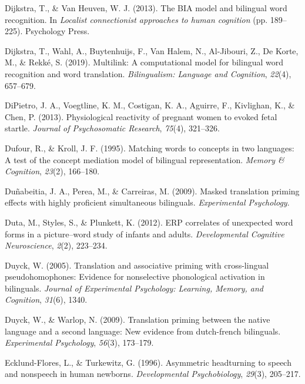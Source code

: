 \documentclass[
  12pt,
  b5paperpaper,
  twoside]{scrreprt}
\newlength{\cslhangindent}
\newlength{\cslentryspacingunit} %
\newenvironment{CSLReferences}[2] %
 {%
  \setlength{\parindent}{0pt}
  \ifodd #1
  \let\oldpar\par
  \def\par{\hangindent=\cslhangindent\oldpar}
  \fi
  \setlength{\parskip}{#2\cslentryspacingunit}
 }%
 {}
\begin{document}
\begin{CSLReferences}{1}{0}
\leavevmode{}%
Dijkstra, T., \& Van Heuven, W. J. (2013). The BIA model and bilingual
word recognition. In \emph{Localist connectionist approaches to human
cognition} (pp. 189--225). Psychology Press.

\leavevmode{}%
Dijkstra, T., Wahl, A., Buytenhuijs, F., Van Halem, N., Al-Jibouri, Z.,
De Korte, M., \& Rekké, S. (2019). Multilink: A computational model for
bilingual word recognition and word translation. \emph{Bilingualism:
Language and Cognition}, \emph{22}(4), 657--679.

\leavevmode{}%
DiPietro, J. A., Voegtline, K. M., Costigan, K. A., Aguirre, F.,
Kivlighan, K., \& Chen, P. (2013). Physiological reactivity of pregnant
women to evoked fetal startle. \emph{Journal of Psychosomatic Research},
\emph{75}(4), 321--326.

\leavevmode{}%
Dufour, R., \& Kroll, J. F. (1995). Matching words to concepts in two
languages: A test of the concept mediation model of bilingual
representation. \emph{Memory \& Cognition}, \emph{23}(2), 166--180.

\leavevmode{}%
Duñabeitia, J. A., Perea, M., \& Carreiras, M. (2009). Masked
translation priming effects with highly proficient simultaneous
bilinguals. \emph{Experimental Psychology}.

\leavevmode{}%
Duta, M., Styles, S., \& Plunkett, K. (2012). ERP correlates of
unexpected word forms in a picture--word study of infants and adults.
\emph{Developmental Cognitive Neuroscience}, \emph{2}(2), 223--234.

\leavevmode{}%
Duyck, W. (2005). Translation and associative priming with cross-lingual
pseudohomophones: Evidence for nonselective phonological activation in
bilinguals. \emph{Journal of Experimental Psychology: Learning, Memory,
and Cognition}, \emph{31}(6), 1340.

\leavevmode{}%
Duyck, W., \& Warlop, N. (2009). Translation priming between the native
language and a second language: New evidence from dutch-french
bilinguals. \emph{Experimental Psychology}, \emph{56}(3), 173--179.

\leavevmode{}%
Ecklund-Flores, L., \& Turkewitz, G. (1996). Asymmetric headturning to
speech and nonspeech in human newborns. \emph{Developmental
Psychobiology}, \emph{29}(3), 205--217.


\end{CSLReferences}
\end{document}
